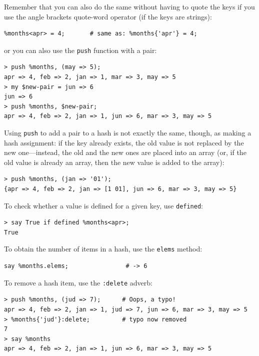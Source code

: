 Remember that you can also do the same without having to 
quote the keys if you use the angle brackets quote-word 
operator (if the keys are strings):

\begin{verbatim}
%months<apr> = 4;       # same as: %months{'apr'} = 4;
\end{verbatim}

or you can also use the {\tt push} function with a pair:

\begin{verbatim}
> push %months, (may => 5);
apr => 4, feb => 2, jan => 1, mar => 3, may => 5
> my $new-pair = jun => 6
jun => 6
> push %months, $new-pair;
apr => 4, feb => 2, jan => 1, jun => 6, mar => 3, may => 5
\end{verbatim}
%

Using {\tt push} to add a pair to a hash is not exactly the same, 
though, as making a hash assignment: if the key already 
exists, the old value is not replaced by the new one---instead,  
the old and the new ones are placed into an array (or, 
if the old value is already an array, then the new value 
is added to the array):

\begin{verbatim}
> push %months, (jan => '01');
{apr => 4, feb => 2, jan => [1 01], jun => 6, mar => 3, may => 5}
\end{verbatim}

To check whether a value is defined for a given key, 
use {\tt defined}:

\begin{verbatim}
> say True if defined %months<apr>;
True
\end{verbatim}
%

To obtain the number of items in a hash, use the {\tt elems}
method:

\begin{verbatim}
say %months.elems;                # -> 6
\end{verbatim}

To remove a hash item, use the {\tt :delete} adverb:

\begin{verbatim}
> push %months, (jud => 7);      # Oops, a typo!
apr => 4, feb => 2, jan => 1, jud => 7, jun => 6, mar => 3, may => 5
> %months{'jud'}:delete;         # typo now removed
7
> say %months
apr => 4, feb => 2, jan => 1, jun => 6, mar => 3, may => 5
\end{verbatim}

